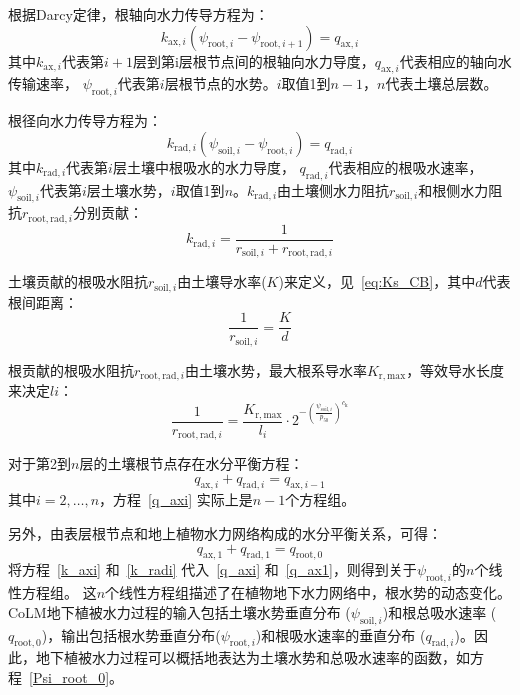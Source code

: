 根据Darcy定律，根轴向水力传导方程为：
\begin{equation}\label{k_axi}
  k_{\mathrm{ax},i}\left(\psi_{\mathrm{root},i}-\psi_{\mathrm{root},i+1}\right)=q_{\mathrm{ax},i}
\end{equation}
其中$k_{\mathrm{ax},i}$代表第$i+1$层到第i层根节点间的根轴向水力导度，$q_{\mathrm{ax},i}$代表相应的轴向水传输速率，
$\psi_{\mathrm{root},i}$代表第$i$层根节点的水势。$i$取值1到$n-1$，$n$代表土壤总层数。

根径向水力传导方程为：
\begin{equation}\label{k_radi}
  k_{\mathrm{rad},i}\left(\psi_{\mathrm{soil},i}-\psi_{\mathrm{root},i}\right)=q_{\mathrm{rad},i}
\end{equation}
其中$k_{\mathrm{rad},i}$代表第$i$层土壤中根吸水的水力导度，
$q_{\mathrm{rad},i}$代表相应的根吸水速率，$\psi_{\mathrm{soil},i}$代表第$i$层土壤水势，$i$取值1到$n$。$k_{\mathrm{rad},i}$由土壤侧水力阻抗$r_{\mathrm{soil},i}$和根侧水力阻抗$r_{\mathrm{root,rad},i}$分别贡献：
\begin{equation}\label{k_radi_r}
    k_{\mathrm{rad},i}=\frac{1}{r_{\mathrm{soil},i}+r_{\mathrm{root,rad},i}}
\end{equation}

土壤贡献的根吸水阻抗$r_{\mathrm{soil},i}$由土壤导水率($K$)来定义，见~\eqref{eq:Ks_CB}，其中$d$代表根间距离：
\begin{equation}
    \frac{1}{r_{\mathrm{soil},i}}=\frac{K}{d}
\end{equation}

根贡献的根吸水阻抗$r_{\mathrm{root,rad},i}$由土壤水势，最大根系导水率$K_{\mathrm{r,max}}$，等效导水长度来决定$l{i}$：
\begin{equation}
  \frac{1}{r_{\mathrm{root,rad},i}}=\frac{K_{\mathrm{r,max}}}{l_{i}}\cdot 2^{-\left(\frac{\psi_{\mathrm{soil},i}}{p_{50}}\right)^{c_{\mathrm{k}}}}
\end{equation}

对于第2到$n$层的土壤根节点存在水分平衡方程：
\begin{equation}\label{q_axi}
  q_{\mathrm{a x},i}+q_{\mathrm{r a d},i}=q_{\mathrm{a x}, i-1}
\end{equation}
其中$i=2, \ldots, n$，方程~\eqref{q_axi} 实际上是$n-1$个方程组。


另外，由表层根节点和地上植物水力网络构成的水分平衡关系，可得：
\begin{equation}\label{q_ax1}
  q_{\mathrm{ax,1}}+q_{\mathrm{rad, 1}}=q_{\mathrm{root,0}}
\end{equation}
将方程~\eqref{k_axi} 和~\eqref{k_radi} 代入~\eqref{q_axi} 和~\eqref{q_ax1}，则得到关于$ \psi_{\mathrm{root},i}$的$n$个线性方程组。
这$n$个线性方程组描述了在植物地下水力网络中，根水势的动态变化。CoLM地下植被水力过程的输入包括土壤水势垂直分布 ($\psi_{\mathrm{soil},i}$)和根总吸水速率 ($q_{\mathrm{root,0}}$)，输出包括根水势垂直分布($\psi_{\mathrm{root},i}$)和根吸水速率的垂直分布 ($q_{\mathrm{rad},i}$)。因此，地下植被水力过程可以概括地表达为土壤水势和总吸水速率的函数，如方程~\eqref{Psi_root_0}。


